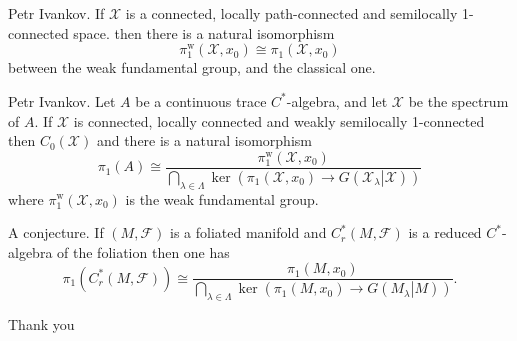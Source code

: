 \documentclass{beamer}
\theoremstyle{plain}
\newcommand{\sF}{\mathcal{F}}       %
\newcommand{\sX}{\mathcal{X}}       %
\newcommand{\la}{\lambda}
\newcommand{\La}{\Lambda}
\begin{document}
\begin{frame}
\begin{lemma}\alert{Petr Ivankov}.
	If $\sX$ is a connected, locally path-connected  and  semilocally 1-connected  space. then there is a natural isomorphism
	$$
	\pi_1^{\mathrm{w}}\left(\sX, x_0 \right)\cong \pi_1\left(\sX, x_0 \right)
	$$
	between the weak fundamental group, and the classical one.
	
\end{lemma}

\begin{theorem}\alert{Petr Ivankov}.
Let $A$ be a continuous trace $C^*$-algebra, and let $\sX$ be the spectrum of $A$. 	If  $\sX$ is connected, locally connected and weakly semilocally 1-connected then $C_0\left(\sX \right)$ and there is a natural isomorphism 
	$$
	\pi_1\left( A\right)  \cong \frac{\pi^{\text{w}}_1\left(\sX, x_0\right)}{\bigcap_{\la\in \La} \ker \left( \pi_1\left( \sX, x_0\right)\to G\left(\left. \sX_\la  \right| \sX\right)\right)}
	$$
	where $\pi^{\text{w}}_1\left(\sX, x_0\right)$ is the weak fundamental group. 
\end{theorem}

\end{frame}
\begin{frame}
\alert{A conjecture}.
If $\left(M, \sF \right)$ is a foliated manifold and $C^*_r\left(M, \sF \right)$ is a reduced $C^*$-algebra of the foliation then one has
$$
	\pi_1\left(C^*_r\left(M, \sF \right)\right)  \cong \frac{\pi_1\left(M, x_0\right)}{\bigcap_{\la\in \La} \ker \left( \pi_1\left( M, x_0\right)\to G\left(\left. M_\la  \right| M\right)\right)}.
$$  


\end{frame}
\begin{frame}
	\alert{Thank you}
	
	
\end{frame}
\end{document}
